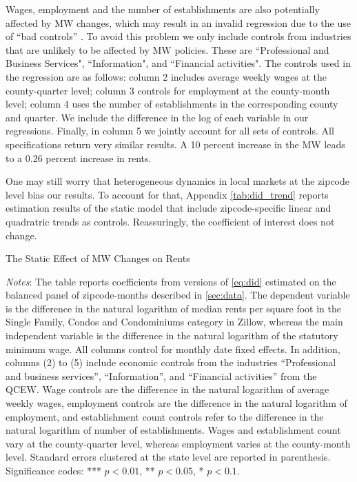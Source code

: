 Wages, employment and the number of establishments are also potentially affected by MW changes,
which may result in an invalid regression due to the use of ``bad controls'' 
\parencite{AngristPischke2009}. To avoid this problem we only include controls from industries 
that are unlikely to be affected by MW policies. These are ``Professional and Business Services", 
``Information", and ``Financial activities". The controls used in the regression are as follows:
column 2 includes average weekly wages at the county-quarter level; column 3 controls for 
employment at the county-month level; column 4 uses the number of establishments in the 
corresponding county and quarter. We include the difference in the log of each variable in our
regressions. Finally, in column 5 we jointly account for all sets of controls. All specifications 
return very similar results. A 10 percent increase in the MW leads to a 0.26 percent increase 
in rents. 

One may still worry that heterogeneous dynamics in local markets at the zipcode level bias our 
results. To account for that, Appendix \autoref{tab:did_trend} reports estimation 
results of the static model that include zipcode-specific linear and quadratric trends as controls. 
Reassuringly, the coefficient of interest does not change.

\begin{table}[h!]
    \caption{The Static Effect of MW Changes on Rents}
    \label{tab:static_model}
    \centering
    
    \begin{minipage}{0.9\textwidth} \footnotesize
		\vspace{3mm} 
		\textit{Notes}: The table reports coefficients from versions of \autoref{eq:did} 
		estimated on the balanced panel of zipcode-months described in \autoref{sec:data}. 
		The dependent variable is the difference in the natural logarithm of median	rents 
		per square foot in the Single Family, Condos and Condominiums category in Zillow, 
		whereas the main independent variable is the difference in the natural logarithm of 
		the statutory minimum wage. All columns control for monthly date fixed effects. In 
		addition, columns (2) to (5) include economic controls from the industries 
		``Professional and business services'', ``Information'', and ``Financial activities'' 
		from the QCEW. Wage controls are the difference in the natural logarithm of average 
		weekly wages, employment controls are the difference in the natural logarithm of 
		employment, and establishment count controls refer to the difference in the natural 
		logarithm of number of establishments. Wages and establishment count vary at the 
		county-quarter level, whereas employment varies at the county-month level. 
		Standard errors clustered at the state level are reported in parenthesis. Significance 
		codes: *** $p < 0.01$, ** $p < 0.05$, * $p < 0.1$.
	\end{minipage}
\end{table}

